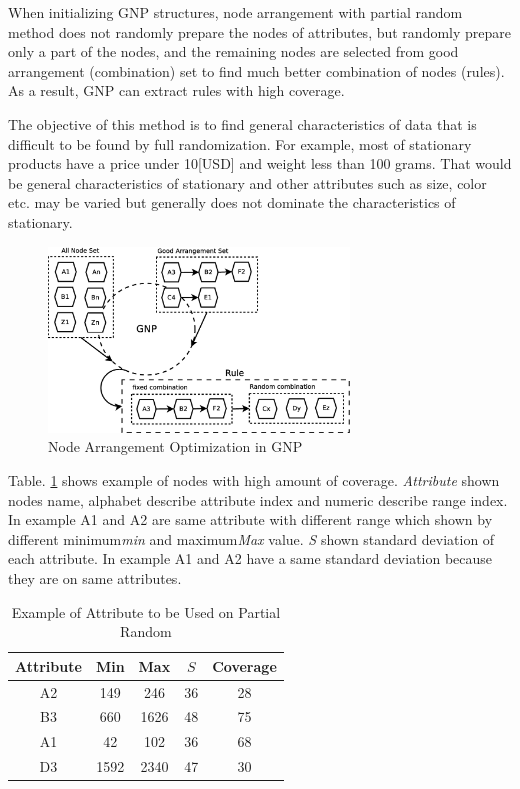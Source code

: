 \documentclass[fleqn,10pt,twocolumn]{SICE14}
\begin{document}
When initializing GNP structures, node arrangement with partial random method does not randomly prepare the nodes of attributes, but randomly prepare only a part of the nodes, and the remaining nodes are selected from good arrangement (combination) set to find much better combination of nodes (rules). 
As a result, GNP can extract rules with high coverage.

The objective of this method is to find general characteristics of data that is difficult to be found by full randomization. For example, most of stationary products have a price under 10[USD] and weight less than 100 grams. That would be general characteristics of stationary and other attributes such as size, color etc. may be varied but generally does not dominate the characteristics of stationary.

\begin{figure}
\includegraphics[width=8cm]{newgnp}
\caption{\label{newgnp} Node Arrangement Optimization in GNP}
\end{figure}

Table. \ref{partial-random-attribute-example} shows example of nodes with high amount of coverage. {\it Attribute} shown nodes name, alphabet describe attribute index and numeric describe range index. In example A1 and A2 are same attribute with different range which shown by different minimum{\it min} and maximum{\it Max} value. {\it S} shown standard deviation of each attribute. In example A1 and A2 have a same standard deviation because they are on same attributes.

\begin{table}[tb]
\caption{\label{partial-random-attribute-example}Example of Attribute to be Used on Partial Random}
\begin{center}
\begin{tabular}{|c|c|c|c|c|}
\hline 
Attribute & Min & Max & $S$ & Coverage\tabularnewline
\hline 
A2 & 149 & 246 & 36 & 28\tabularnewline
\hline 
B3 & 660 & 1626 & 48 & 75\tabularnewline
\hline 
A1 & 42 & 102 & 36 & 68\tabularnewline
\hline 
D3 & 1592 & 2340 & 47 & 30\tabularnewline
\hline 
\end{tabular}
\end{center}
\end{table}
\end{document}
